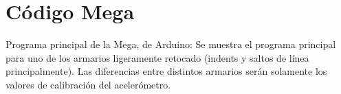
\chapter{Código Mega} %

\label{app:megacode} %

Programa principal de la Mega, de Arduino: Se muestra el programa principal para uno de los armarios ligeramente retocado (indents y saltos de línea principalmente). Las diferencias entre distintos armarios serán solamente los valores de calibración del acelerómetro.

\newpage


